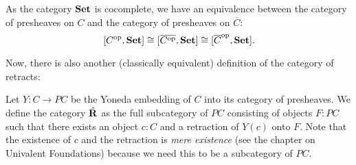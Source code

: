 \begin{corollary}\label{cor:karoubi-presheaf}
  As the category $ \mathbf{Set} $ is cocomplete, we have an equivalence between the category of presheaves on $ C $ and the category of presheaves on $ \overline C $:
  \[ [C^{\text{op}}, \mathbf{Set}] \cong [\overline{C^{\text{op}}}, \mathbf{Set}] \cong [\overline C^{\text{op}}, \mathbf{Set}]. \]
\end{corollary}

Now, there is also another (classically equivalent) definition of the category of retracts:
\begin{definition}
  Let $ Y: C \to P C $ be the Yoneda embedding of $ C $ into its category of presheaves. We define the category $ \hat {\mathbf{R}} $ as the full subcategory of $ P C $ consisting of objects $ F : P C $ such that there exists an object $ c: C $ and a retraction of $ Y(c) $ onto $ F $. Note that the existence of $ c $ and the retraction is \textit{mere existence} (see the chapter on Univalent Foundations) because we need this to be a subcategory of $ P C $.
\end{definition}

